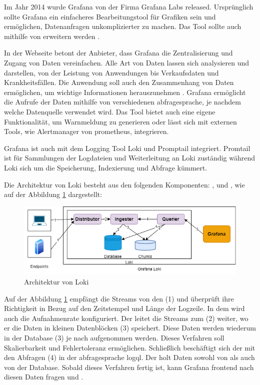 Im Jahr 2014 wurde Grafana von der Firma Grafana Labs released. Ursprünglich sollte Grafana ein einfacheres Bearbeitungstool für Grafiken sein und ermöglichen, Datenanfragen unkomplizierter zu machen. Das Tool sollte auch  mithilfe von  erweitern werden \citep{Oedegaard_historyGrafana}.

In der Webseite betont der Anbieter, dass Grafana die Zentralisierung und Zugang von Daten vereinfachen. Alle Art von Daten lassen sich analysieren und darstellen, von der Leistung von Anwendungen bis Verkaufsdaten und Krankheitsfällen. Die Anwendung soll auch den Zusammenhang von Daten ermöglichen, um wichtige Informationen herauszunehmen \citep{Grafana_Grafana}. Grafana ermöglicht die Aufrufe der Daten mithilfe von verschiedenen \gls{abfragesprache}, je nachdem welche Datenquelle verwendet wird. Das Tool bietet auch eine eigene Funktionalität, um Warnmeldung zu generieren oder lässt sich mit externen Tools, wie Alertmanager von \gls{prometheus}, integrieren. 

Grafana ist auch mit dem Logging Tool Loki und Promptail integriert. Promtail ist für Sammlungen der Logdateien und Weiterleitung an Loki zuständig während Loki sich um die Speicherung, Indexierung und Abfrage kümmert.

Die Architektur von Loki besteht aus den folgenden Komponenten: ,  und , wie auf der Abbildung
\ref{fig:Loki-Architektur} dargestellt:

\begin{figure}[H]
   \centering
   \includegraphics[width=1\textwidth]{assets/LokiArchitektur.drawio.png}
   \caption[Architektur von Loki]
   {Architektur von Loki \cite{Grafana_LokiArchitektur2}}
   \label{fig:Loki-Architektur}
   \centering
 \end{figure}
 
Auf der Abbildung \ref{fig:Loki-Architektur} empfängt   die Streams von den (1)  und überprüft ihre Richtigkeit in Bezug auf den Zeitstempel und Länge der Logzeile. In dem  wird auch die Aufnahmenrate konfiguriert. Der  leitet die Streams zum (2)  weiter, wo er die Daten in kleinen Datenblöcken (3) speichert. Diese Daten werden wiederum in der Database (3) je nach  aufgenommen werden. Dieses Verfahren soll Skalierbarkeit und Fehlertoleranz ermöglichen. Schließlich beschäftigt sich der  mit den Abfragen (4) in der \gls{abfragesprache} \gls{logql}. Der  holt Daten sowohl von  als auch von der Database. Sobald dieses Verfahren fertig ist, kann Grafana \gls{frontend} nach diesen Daten fragen \citep{Grafana_LokiArchitektur} und \citep{Grafana_LokiArchitektur2}.

